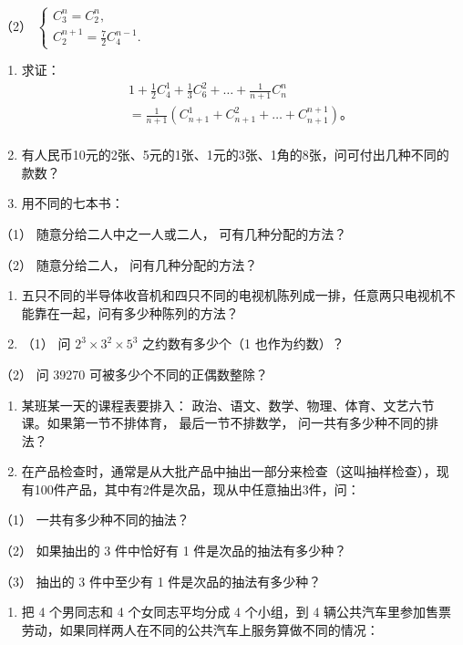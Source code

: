 （2）
\(\left\{ \begin{array}{l} C_3^n = C_2^n, \\ C_2^{n+1} = \frac{7}{2} C_4^{n-1}. \end{array} \right.\)

\begin{enumerate}[start=3]
\item
  求证：
\[
\begin{array}{l} 1 + \frac {1}{2} C _ {4} ^ {1} + \frac {1}{3} C _ {6} ^ {2} + \dots + \frac {1}{n + 1} C _ {n} ^ {n} \\ = \frac {1}{n + 1} (C _ {n + 1} ^ {1} + C _ {n + 1} ^ {2} + \dots + C _ {n + 1} ^ {n + 1})\text{。} \\ \end{array}
\]
\item
  有人民币10元的2张、5元的1张、1元的3张、1角的8张，问可付出几种不同的款数？
\item
  用不同的七本书：
\end{enumerate}

（1） 随意分给二人中之一人或二人， 可有几种分配的方法？

（2） 随意分给二人， 问有几种分配的方法？

\begin{enumerate}[start=6]
\item
  五只不同的半导体收音机和四只不同的电视机陈列成一排，任意两只电视机不能靠在一起，问有多少种陈列的方法？
\item
  （1） 问 \(2^{3} \times 3^{2} \times 5^{3}\) 之约数有多少个（1
  也作为约数）？
\end{enumerate}

（2） 问 39270 可被多少个不同的正偶数整除？

\begin{enumerate}[start=8]
\item
  某班某一天的课程表要排入：
  政治、语文、数学、物理、体育、文艺六节课。如果第一节不排体育，
  最后一节不排数学， 问一共有多少种不同的排法？
\item
  在产品检查时，通常是从大批产品中抽出一部分来检查（这叫抽样检查），现有100件产品，其中有2件是次品，现从中任意抽出3件，问：
\end{enumerate}

（1） 一共有多少种不同的抽法？

（2） 如果抽出的 3 件中恰好有 1 件是次品的抽法有多少种？

（3） 抽出的 3 件中至少有 1 件是次品的抽法有多少种？

\begin{enumerate}[start=10]
\item
  把 4 个男同志和 4 个女同志平均分成 4 个小组，到 4
  辆公共汽车里参加售票劳动，如果同样两人在不同的公共汽车上服务算做不同的情况：
\end{enumerate}

